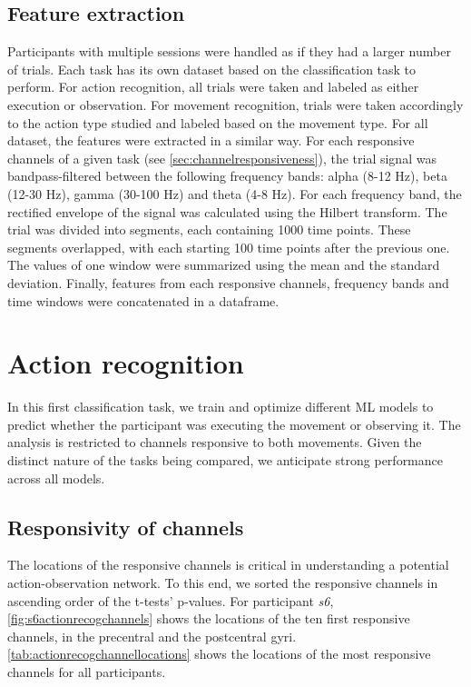 \documentclass[10pt,conference,compsocconf]{IEEEtran}
\begin{document}
\subsection{Feature extraction}
Participants with multiple sessions were handled as if they had a larger number of trials. Each task has its own dataset based on the classification task to perform. For action recognition, all trials were taken and labeled as either execution or observation. For movement recognition, trials were taken accordingly to the action type studied and labeled based on the movement type. For all dataset, the features were extracted in a similar way. For each responsive channels of a given task (see \ref{sec:channelresponsiveness}), the trial signal was bandpass-filtered between the following frequency bands: alpha (8-12 Hz), beta (12-30 Hz), gamma (30-100 Hz) and theta (4-8 Hz). For each frequency band, the rectified envelope of the signal was calculated using the Hilbert transform. The trial was divided into segments, each containing 1000 time points. These segments overlapped, with each starting 100 time points after the previous one. The values of one window were summarized using the mean and the standard deviation. Finally, features from each responsive channels, frequency bands and time windows were concatenated in a dataframe.

\section{Action recognition}
\label{sec:actionrecognition}
In this first classification task, we train and optimize different ML models to predict whether the participant was executing the movement or observing it. The analysis is restricted to channels responsive to both movements. Given the distinct nature of the tasks being compared, we anticipate strong performance across all models.

\subsection{Responsivity of channels}
The locations of the responsive channels is critical in understanding a potential action-observation network. To this end, we sorted the responsive channels in ascending order of the t-tests' p-values. For participant \textit{s6}, \autoref{fig:s6actionrecogchannels} shows the locations of the ten first responsive channels, in the precentral and the postcentral gyri. \autoref{tab:actionrecogchannellocations} shows the locations of the most responsive channels for all participants.
\end{document}
